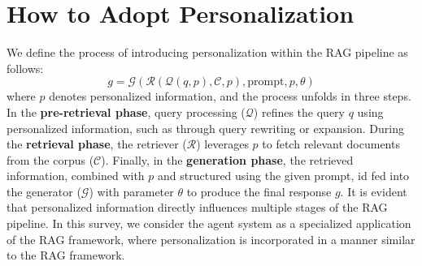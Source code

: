 \section{How to Adopt Personalization} \label{sec:how}
We define the process of introducing personalization within the RAG pipeline as follows:
\begin{equation}\label{equ:definition}
g = \mathcal{G} \left( \mathcal{R}\left(\mathcal{Q}\left(q,p\right),\mathcal{C},p\right),\text{prompt},p,\theta \right)
\end{equation}
where $p$ denotes personalized information, and the process unfolds in three steps. In the \textbf{pre-retrieval phase}, query processing ($\mathcal{Q}$) refines the query $q$ using personalized information, such as through query rewriting or expansion. During the \textbf{retrieval phase}, the retriever ($\mathcal{R}$) leverages $p$ to fetch relevant documents from the corpus ($\mathcal{C}$). Finally, in the \textbf{generation phase}, the retrieved information, combined with $p$ and structured using the given prompt, id fed into the generator ($\mathcal{G}$) with parameter $\theta$ to produce the final response $g$. It is evident that personalized information directly influences multiple stages of the RAG pipeline. In this survey, we consider the agent system as a specialized application of the RAG framework, where personalization is incorporated in a manner similar to the RAG framework.